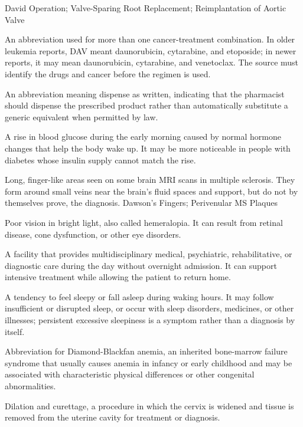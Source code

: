 \synonyms
David Operation; Valve-Sparing Root Replacement; Reimplantation of Aortic Valve

 An abbreviation used for more than one cancer-treatment combination. In older leukemia reports, DAV meant daunorubicin, cytarabine, and etoposide; in newer reports, it may mean daunorubicin, cytarabine, and venetoclax. The source must identify the drugs and cancer before the regimen is used.

 An abbreviation meaning dispense as written, indicating that the pharmacist should dispense the prescribed product rather than automatically substitute a generic equivalent when permitted by law.

 A rise in blood glucose during the early morning caused by normal hormone changes that help the body wake up. It may be more noticeable in people with diabetes whose insulin supply cannot match the rise.

 Long, finger-like areas seen on some brain MRI scans in multiple sclerosis. They form around small veins near the brain's fluid spaces and support, but do not by themselves prove, the diagnosis.
\synonyms
Dawson's Fingers; Perivenular MS Plaques

 Poor vision in bright light, also called hemeralopia. It can result from retinal disease, cone dysfunction, or other eye disorders.

 A facility that provides multidisciplinary medical, psychiatric, rehabilitative, or diagnostic care during the day without overnight admission. It can support intensive treatment while allowing the patient to return home.

 A tendency to feel sleepy or fall asleep during waking hours. It may follow insufficient or disrupted sleep, or occur with sleep disorders, medicines, or other illnesses; persistent excessive sleepiness is a symptom rather than a diagnosis by itself.

 Abbreviation for Diamond-Blackfan anemia, an inherited bone-marrow failure syndrome that usually causes anemia in infancy or early childhood and may be associated with characteristic physical differences or other congenital abnormalities.

 Dilation and curettage, a procedure in which the cervix is widened and tissue is removed from the uterine cavity for treatment or diagnosis.

